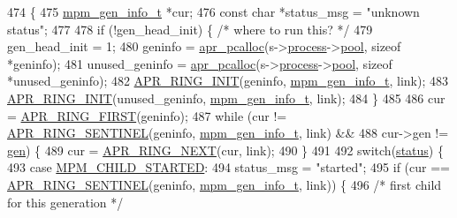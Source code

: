 \begin{DoxyCode}
474 \{
475     \hyperlink{mpm__common_8c_afa405cb7c9127c99de1c31568ad45a77}{mpm\_gen\_info\_t} *cur;
476     \textcolor{keyword}{const} \textcolor{keywordtype}{char} *status\_msg = \textcolor{stringliteral}{"unknown status"};
477 
478     \textcolor{keywordflow}{if} (!gen\_head\_init) \{ \textcolor{comment}{/* where to run this? */}
479         gen\_head\_init = 1;
480         geninfo = \hyperlink{group__apr__pools_gad214fc0160de3c22b6435e29ea20fce8}{apr\_pcalloc}(s->\hyperlink{structserver__rec_a3b662494b2e2b691143ffb85b1c1d658}{process}->\hyperlink{structprocess__rec_a10adc2d7a7a46a5285e6033cad375f24}{pool}, \textcolor{keyword}{sizeof} *geninfo);
481         unused\_geninfo = \hyperlink{group__apr__pools_gad214fc0160de3c22b6435e29ea20fce8}{apr\_pcalloc}(s->\hyperlink{structserver__rec_a3b662494b2e2b691143ffb85b1c1d658}{process}->\hyperlink{structprocess__rec_a10adc2d7a7a46a5285e6033cad375f24}{pool}, \textcolor{keyword}{sizeof} *unused\_geninfo);
482         \hyperlink{group__apr__ring_ga245e1a73b162a4a68ebd54c84683729d}{APR\_RING\_INIT}(geninfo, \hyperlink{mpm__common_8c_afa405cb7c9127c99de1c31568ad45a77}{mpm\_gen\_info\_t}, link);
483         \hyperlink{group__apr__ring_ga245e1a73b162a4a68ebd54c84683729d}{APR\_RING\_INIT}(unused\_geninfo, \hyperlink{mpm__common_8c_afa405cb7c9127c99de1c31568ad45a77}{mpm\_gen\_info\_t}, link);
484     \}
485 
486     cur = \hyperlink{group__apr__ring_gacacd9cfca24feb7ff754d4008422efcb}{APR\_RING\_FIRST}(geninfo);
487     \textcolor{keywordflow}{while} (cur != \hyperlink{group__apr__ring_ga54210090292ebafcd0a0d75d9ff1563d}{APR\_RING\_SENTINEL}(geninfo, \hyperlink{mpm__common_8c_afa405cb7c9127c99de1c31568ad45a77}{mpm\_gen\_info\_t}, link) &&
488            cur->gen != \hyperlink{group__APACHE__MPM_ga37021508479f4dcebba4054a070491d8}{gen}) \{
489         cur = \hyperlink{group__apr__ring_gae42e4f7148719aa534bdbbc82be26a06}{APR\_RING\_NEXT}(cur, link);
490     \}
491 
492     \textcolor{keywordflow}{switch}(\hyperlink{group__APACHE__CORE__HTTPD_ga6e27f49150e9a14580fb313cc2777e00}{status}) \{
493     \textcolor{keywordflow}{case} \hyperlink{group__APACHE__CORE__MPM_gga2ad69bc5389eabd0ec49889d8bf67be3ad09a361e8798f0f62adbdcc16a2071d6}{MPM\_CHILD\_STARTED}:
494         status\_msg = \textcolor{stringliteral}{"started"};
495         \textcolor{keywordflow}{if} (cur == \hyperlink{group__apr__ring_ga54210090292ebafcd0a0d75d9ff1563d}{APR\_RING\_SENTINEL}(geninfo, \hyperlink{mpm__common_8c_afa405cb7c9127c99de1c31568ad45a77}{mpm\_gen\_info\_t}, link)) \{
496             \textcolor{comment}{/* first child for this generation */}

\end{DoxyCode}
